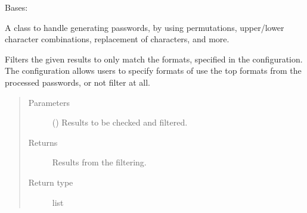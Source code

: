 \documentclass[letterpaper,10pt,english]{sphinxmanual}
\begin{document}
\begin{fulllineitems}
\label{\detokenize{EntroPass:EntroPass.pwd_gen.Pwd_gen}}
\sphinxAtStartPar
Bases: 

\sphinxAtStartPar
A class to handle generating passwords, by using permutations, upper/lower
character combinations, replacement of characters, and more.

\begin{fulllineitems}
\label{\detokenize{EntroPass:EntroPass.pwd_gen.Pwd_gen.filter}}
\sphinxAtStartPar
Filters the given results to only match the formats, specified in the configuration.
The configuration allows users to specify formats of use the top formats from
the processed passwords, or not filter at all.
\begin{quote}\begin{description}
\item[{Parameters}] \leavevmode
\sphinxAtStartPar
{} () \textendash{} Results to be checked and filtered.

\item[{Returns}] \leavevmode
\sphinxAtStartPar
{} \textendash{} Results from the filtering.

\item[{Return type}] \leavevmode
\sphinxAtStartPar
list

\end{description}\end{quote}

\end{fulllineitems}



\end{fulllineitems}
\end{document}
